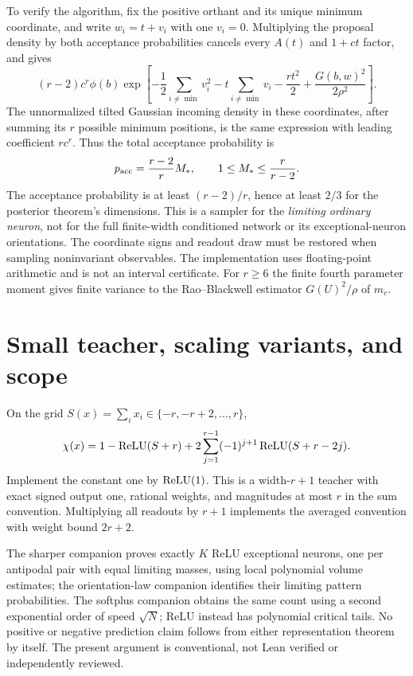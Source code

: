 \documentclass[11pt]{article}
\begin{document}
To verify the algorithm, fix the positive orthant and its unique minimum
coordinate, and write $w_i=t+v_i$ with one $v_i=0$. Multiplying the
proposal density by both acceptance probabilities cancels every $A(t)$
and $1+ct$ factor, and gives
\[
 (r-2)c^r\phi(b)
 \exp\left[-\frac12\sum_{i\ne\min}v_i^2-t\sum_{i\ne\min}v_i
             -\frac{rt^2}{2}+\frac{G(b,w)^2}{2\rho^2}\right].
\]
The unnormalized tilted Gaussian incoming density in these coordinates,
after summing its $r$ possible minimum positions, is the same expression
with leading coefficient $rc^r$. Thus the total acceptance probability is
\[
 p_{\rm acc}=\frac{r-2}{r}M_*,\qquad
 1\le M_*\le\frac r{r-2}.
\]
The acceptance probability is at least $(r-2)/r$, hence at least $2/3$
for the posterior theorem's dimensions. This is a sampler for the
\emph{limiting ordinary neuron}, not for the full finite-width conditioned
network or its exceptional-neuron orientations. The coordinate signs
and readout draw must be restored when sampling noninvariant observables.
The implementation uses floating-point arithmetic and is not an interval
certificate. For $r\ge6$ the finite fourth parameter moment gives finite
variance to the Rao--Blackwell estimator $G(U)^2/\rho$ of $m_c$.

\section{Small teacher, scaling variants, and scope}
On the grid $S(x)=\sum_i x_i\in\{-r,-r+2,\ldots,r\}$,
\[
 \chi(x)=1-\operatorname{ReLU}(S+r)
       +2\sum_{j=1}^{r-1}(-1)^{j+1}\operatorname{ReLU}(S+r-2j).
\]
Implement the constant one by $\operatorname{ReLU}(1)$. This is a width-$r+1$
teacher with exact signed output one, rational weights, and magnitudes
at most $r$ in the sum convention. Multiplying all readouts by $r+1$
implements the averaged convention with weight bound $2r+2$.

The sharper companion proves exactly $K$ ReLU exceptional neurons,
one per antipodal pair with equal limiting masses, using local polynomial
volume estimates; the orientation-law companion identifies their limiting
pattern probabilities. The softplus companion obtains the same count using a
second exponential order of speed $\sqrt N$; ReLU instead has
polynomial critical tails. No positive or negative
prediction claim follows from either representation theorem by itself.
The present argument is conventional, not Lean verified or independently
reviewed.
\end{document}
